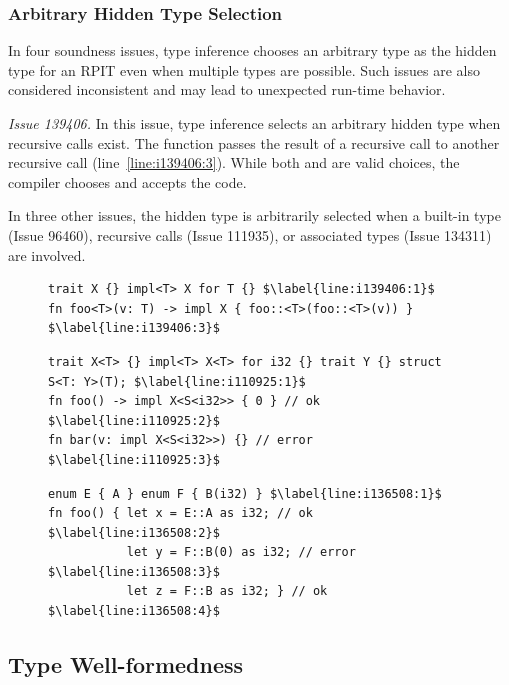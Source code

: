 \subsubsection{Arbitrary Hidden Type Selection}

In four soundness issues, type inference chooses an arbitrary type as the
hidden type for an RPIT even when multiple types are possible.
%
Such issues are also considered inconsistent and may lead to unexpected run-time
behavior.

{\it Issue 139406.}
%
In this issue, type inference selects an arbitrary hidden type when recursive
calls exist.
%
The function  passes the result of a recursive call to another recursive
call (line~\ref{line:i139406:3}).
%
While both  and \C{!} are valid choices, the compiler chooses  and
accepts the code.

In three other issues, the hidden type is arbitrarily selected when
a built-in type  (Issue 96460),
recursive calls (Issue 111935), or associated types (Issue 134311) are involved.

\begin{figure}[t]
\begin{lstlisting}[caption={Issue 139406}, label={lst:i139406}]
trait X {} impl<T> X for T {} $\label{line:i139406:1}$
fn foo<T>(v: T) -> impl X { foo::<T>(foo::<T>(v)) } $\label{line:i139406:3}$
\end{lstlisting}
\vspace{-1em}
\begin{lstlisting}[caption={Issue 110925}, label={lst:i110925}]
trait X<T> {} impl<T> X<T> for i32 {} trait Y {} struct S<T: Y>(T); $\label{line:i110925:1}$
fn foo() -> impl X<S<i32>> { 0 } // ok $\label{line:i110925:2}$
fn bar(v: impl X<S<i32>>) {} // error $\label{line:i110925:3}$
\end{lstlisting}
\vspace{-1em}
\begin{lstlisting}[caption={Issue 136508}, label={lst:i136508}]
enum E { A } enum F { B(i32) } $\label{line:i136508:1}$
fn foo() { let x = E::A as i32; // ok $\label{line:i136508:2}$
           let y = F::B(0) as i32; // error $\label{line:i136508:3}$
           let z = F::B as i32; } // ok $\label{line:i136508:4}$
\end{lstlisting}
\vspace{-1em}
\end{figure}

\subsection{Type Well-formedness}

